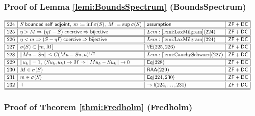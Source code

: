 \documentclass[11pt,reqno]{amsart}
\begin{document}
\medskip

\subsubsection*{Proof of Lemma \ref{lemi:BoundsSpectrum} (\textsf{BoundsSpectrum})}

\noindent$%
\begin{array}{|r|l|l|l|}
\hline\hline
224 & S\;\mathsf{bounded\ self\ adjoint},\;m:=\inf\sigma(S),\;M:=\sup\sigma(S) & \mathsf{assumption} & \mathsf{ZF+DC} \\ \hline\hline
225 & \eta>M\Rightarrow(\eta I-S)\;\mathsf{coercive}\Rightarrow\mathsf{bijective} & Lem:\ref{lemi:LaxMilgram}(224) & \mathsf{ZF+DC} \\ \hline\hline
226 & \eta<m\Rightarrow(S-\eta I)\;\mathsf{coercive}\Rightarrow\mathsf{bijective} & Lem:\ref{lemi:LaxMilgram}(224) & \mathsf{ZF+DC} \\ \hline\hline
227 & \sigma(S)\subset[m,M] & \forall\mathsf{E}(225,226) & \mathsf{ZF+DC} \\ \hline\hline
228 & \|Mu-Su\|\le C(Mu-Su,u)^{1/2} & Lem:\ref{lemi:CauchySchwarz}(227) & \mathsf{ZF+DC} \\ \hline\hline
229 & \|u_{k}\|=1,\;(Su_{k},u_{k})\to M\Rightarrow\|Mu_{k}-Su_{k}\|\to0 & \mathsf{Eq}(228) & \mathsf{ZF+DC} \\ \hline\hline
230 & M\in\sigma(S) & \mathsf{RAA}(229) & \mathsf{ZF+DC} \\ \hline\hline
231 & m\in\sigma(S) & \mathsf{Eq}(224,230) & \mathsf{ZF+DC} \\ \hline\hline
232 & \top & \to\mathsf{I}(224,\dots,231) & \mathsf{ZF+DC} \\ \hline\hline
\end{array}%
$

\medskip

\subsubsection*{Proof of Theorem \ref{thmi:Fredholm} (\textsf{Fredholm})}
\end{document}
